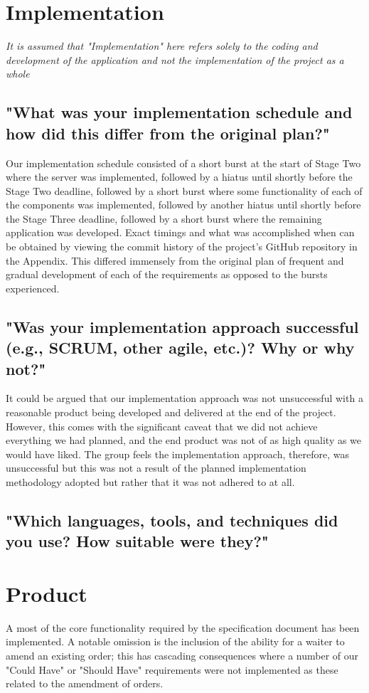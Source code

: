 \documentclass[11pt, oneside, a4paper]{report}   %
\begin{document}
\section{Implementation}
\textit{It is assumed that "Implementation" here refers solely to the coding and development of the application and not the implementation of the project as a whole}
\subsection{"What was your implementation schedule and how did this differ from the original plan?"} \label{sec:Implementation - 1}
Our implementation schedule consisted of a short burst at the start of Stage Two where the server was implemented, followed by a hiatus until shortly before the Stage Two deadline, followed by a short burst where some 
functionality of each of the components was implemented, followed by another hiatus until shortly before the Stage Three deadline, followed by a short burst where the remaining application was developed. Exact timings 
and what was accomplished when can be obtained by viewing the commit history of the project's GitHub repository in the Appendix. This differed immensely from the original plan of frequent and gradual development of
each of the requirements as opposed to the bursts experienced. 
\subsection{"Was your implementation approach successful (e.g., SCRUM, other agile, etc.)? Why or why
not?"} \label{sec:Implementation - 2}
It could be argued that our implementation approach was not unsuccessful with a reasonable product being developed and delivered at the end of the project. However, this comes with the significant caveat that we did not 
achieve everything we had planned, and the end product was not of as high quality as we would have liked. The group feels the implementation approach, therefore, was unsuccessful but this was not a result of the planned 
implementation methodology adopted but rather that it was not adhered to at all.  
\subsection{"Which languages, tools, and techniques did you use? How suitable were they?"} \label{sec:Implementation - 3}
\pagebreak
\section{Product} 
A most of the core functionality required by the specification document has been implemented. A notable omission is the inclusion of the ability for a waiter to amend an existing order; this has cascading consequences where a number of our "Could Have" or "Should Have" requirements were not implemented as these related to the amendment of orders. 
\end{document}
